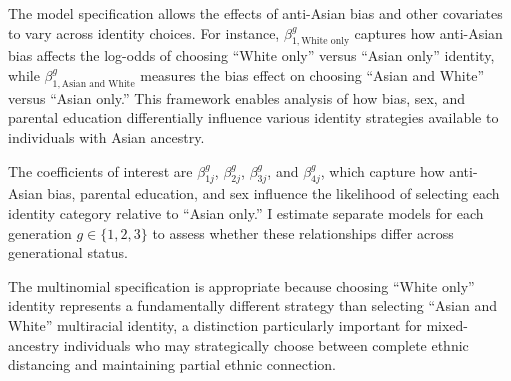 \documentclass[12pt,english]{article}
\begin{document}
The model specification allows the effects of anti-Asian bias and other covariates to vary across identity choices. For instance, $\beta_{1,\text{White only}}^g$ captures how anti-Asian bias affects the log-odds of choosing ``White only'' versus ``Asian only'' identity, while $\beta_{1,\text{Asian and White}}^g$ measures the bias effect on choosing ``Asian and White'' versus ``Asian only.'' This framework enables analysis of how bias, sex, and parental education differentially influence various identity strategies available to individuals with Asian ancestry.

The coefficients of interest are $\beta_{1j}^g$, $\beta_{2j}^g$, $\beta_{3j}^g$, and $\beta_{4j}^g$, which capture how anti-Asian bias, parental education, and sex influence the likelihood of selecting each identity category relative to ``Asian only.'' I estimate separate models for each generation $g \in \{1,2,3\}$ to assess whether these relationships differ across generational status.

The multinomial specification is appropriate because choosing ``White only'' identity represents a fundamentally different strategy than selecting ``Asian and White'' multiracial identity, a distinction particularly important for mixed-ancestry individuals who may strategically choose between complete ethnic distancing and maintaining partial ethnic connection.
\end{document}
